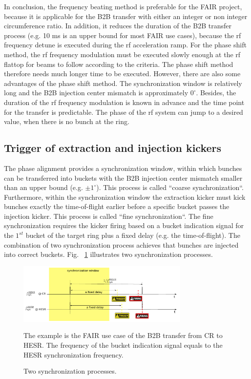 In conclusion, the frequency beating method is preferable for the FAIR project, because it is applicable for the B2B transfer with either an integer or non integer circumference ratio. In addition, it reduces the duration of the B2B transfer process (e.g. 10 ms is an upper bound for most FAIR use cases), because the rf frequency detune is executed during the rf acceleration ramp. For the phase shift method, the rf frequency modulation must be executed slowly enough at the rf flattop for beams to follow according to the criteria. The phase shift method therefore needs much longer time to be executed. However, there are also some advantages of the phase shift method. The synchronization window is relatively long and the B2B injection center mismatch is approximately $0^\circ$. Besides, the duration of the rf frequency modulation is known in advance and the time point for the transfer is predictable. The phase of the rf system can jump to a desired value, when there is no bunch at the ring.  
\subsection{Trigger of extraction and injection kickers}
The phase alignment provides a synchronization window, within which bunches can be transferred into buckets with the B2B injection center mismatch smaller than an upper bound (e.g. $\pm1^\circ$). This process is called ``coarse synchronization``. Furthermore, within the synchronization window the extraction kicker must kick bunches exactly the time-of-flight earlier before a specific bucket passes the injection kicker. This process is called ``fine synchronization``. The fine synchronization requires the kicker firing based on a bucket indication signal for the $1^\mathit{st}$ bucket of the target ring plus a fixed delay (e.g. the time-of-flight). The combination of two synchronization process achieves that bunches are injected into correct buckets. Fig. ~\ref{ext_inj_kicker1} illustrates two synchronization processes.
\begin{figure}[!htb]
   \centering   
   \includegraphics*[width=85mm]{ext_inj_ill2.pdf}
   \caption{Two synchronization processes.}
{\small{The example is the FAIR use case of the B2B transfer from CR to HESR. The frequency of the bucket indication signal equals to the HESR synchronization frequency.}}
   \label{ext_inj_kicker1}
\end{figure}

